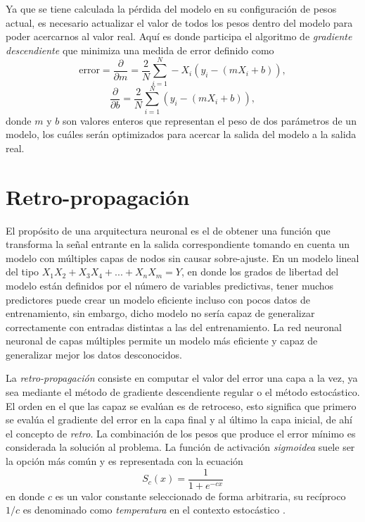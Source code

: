 Ya que se tiene calculada la pérdida del modelo en su configuración de pesos actual, es necesario actualizar el valor de todos los pesos dentro del modelo para poder acercarnos al valor real. Aquí es donde participa el algoritmo de \emph{gradiente descendiente} \citep{alg:gradient} que minimiza una medida de error definido como
\begin{equation}
        \text{error} = \frac{\partial}{\partial m} = \frac{2}{N}\sum_{i=1}^{N}-X_i(y_i-(mX_i+b)),
\end{equation}
\begin{equation}
        \frac{\partial}{\partial b} = \frac{2}{N}\sum_{i=1}^{N}(y_i-(mX_i+b)),
\end{equation}
donde $m$ y $b$ son valores enteros que representan el peso de dos parámetros de un modelo, los cuáles serán optimizados para acercar la salida del modelo a la salida real.

%
%           

\section{Retro-propagación}
El propósito de una arquitectura neuronal es el de obtener una función que transforma la señal entrante en la salida correspondiente tomando en cuenta un modelo con múltiples capas de nodos sin causar sobre-ajuste. En un modelo lineal del tipo $X_1X_2 + X_3X_4+...+X_nX_m = Y$, en donde los grados de libertad del modelo están definidos por el número de variables predictivas, tener muchos predictores puede crear un modelo eficiente incluso con pocos datos de entrenamiento, sin embargo, dicho modelo no sería capaz de generalizar correctamente con entradas distintas a las del entrenamiento. La red neuronal neuronal de capas múltiples permite un modelo más eficiente y capaz de generalizar mejor los datos desconocidos.  

La \emph{retro-propagación} consiste en computar el valor del error una capa a la vez, ya sea mediante el método de gradiente descendiente regular o el método estocástico. El orden en el que las capaz se evalúan es de retroceso, esto significa que primero se evalúa el gradiente del error en la capa final y al último la capa inicial, de ahí el concepto de \emph{retro}. La combinación de los pesos que produce el error mínimo es considerada la solución al problema. La función de activación \emph{sigmoidea} suele ser la opción más común y es representada con la ecuación
\begin{equation}
    S_{c}(x) =  \frac{\mathrm{1} }{\mathrm{1} + e^{-cx}}
\end{equation}
en donde $c$ es un valor constante seleccionado de forma arbitraria, su recíproco $1/c$ es denominado como \emph{temperatura} en el contexto estocástico  \citep{rojas1996backpropagation}. 

